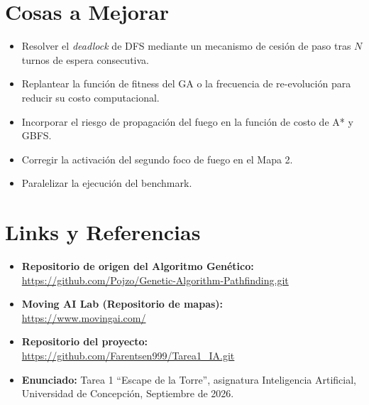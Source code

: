 \documentclass[11pt,a4paper]{article}
\begin{document}
\section{Cosas a Mejorar}
\begin{itemize}
    \item Resolver el \textit{deadlock} de DFS mediante un mecanismo de cesión de paso tras $N$ turnos de espera consecutiva.
    \item Replantear la función de fitness del GA o la frecuencia de re-evolución para reducir su costo computacional.
    \item Incorporar el riesgo de propagación del fuego en la función de costo de A* y GBFS.
    \item Corregir la activación del segundo foco de fuego en el Mapa 2.
    \item Paralelizar la ejecución del benchmark.
\end{itemize}

\section{Links y Referencias}
\label{sec:referencias}

\begin{itemize}
    \item \textbf{Repositorio de origen del Algoritmo Genético:}\\
    \url{https://github.com/Pojzo/Genetic-Algorithm-Pathfinding.git}
    
    \item \textbf{Moving AI Lab (Repositorio de mapas):}\\
    \url{https://www.movingai.com/}
    
    \item \textbf{Repositorio del proyecto:}\\
    \url{https://github.com/Farentsen999/Tarea1_IA.git}
    
    \item \textbf{Enunciado:} Tarea 1 ``Escape de la Torre'', asignatura Inteligencia Artificial, Universidad de Concepción, Septiembre de 2026.
\end{itemize}
\end{document}
